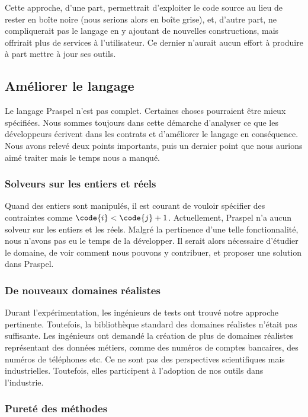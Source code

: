 Cette approche, d'une part, permettrait d'exploiter le code source au lieu de
rester en boîte noire (nous serions alors en boîte grise), et, d'autre part, ne
compliquerait pas le langage en y ajoutant de nouvelles constructions, mais
offrirait plus de services à l'utilisateur. Ce dernier n'aurait aucun effort à
produire à part mettre à jour ses outils.

\subsection{Améliorer le langage}

Le langage Praspel n'est pas complet. Certaines choses pourraient être mieux
spécifiées. Nous sommes toujours dans cette démarche d'analyser ce que les
développeurs écrivent dans les contrats et d'améliorer le langage en
conséquence. Nous avons relevé deux points importants, puis un dernier point que
nous aurions aimé traiter mais le temps nous a manqué.

\subsubsection{Solveurs sur les entiers et réels}

Quand des entiers sont manipulés, il est courant de vouloir spécifier des
contrain\-tes comme $\code{i} < \code{j} + 1$. Actuellement, Praspel n'a aucun
solveur sur les entiers et les réels. Malgré la pertinence d'une telle
fonctionnalité, nous n'avons pas eu le temps de la développer. Il serait alors
nécessaire d'étudier le domaine, de voir comment nous pouvons y contribuer, et
proposer une solution dans Praspel.

\subsubsection{De nouveaux domaines réalistes}

Durant l'expérimentation, les ingénieurs de tests ont trouvé notre approche
pertinente. Toutefois, la bibliothèque standard des domaines réalistes n'était
pas suffisante. Les ingénieurs ont demandé la création de plus de domaines
réalistes représentant des données métiers, comme des numéros de comptes
bancaires, des numéros de téléphones etc. Ce ne sont pas des perspectives
scientifiques mais industrielles. Toutefois, elles participent à l'adoption de
nos outils dans l'industrie.

\subsubsection{Pureté des méthodes}

